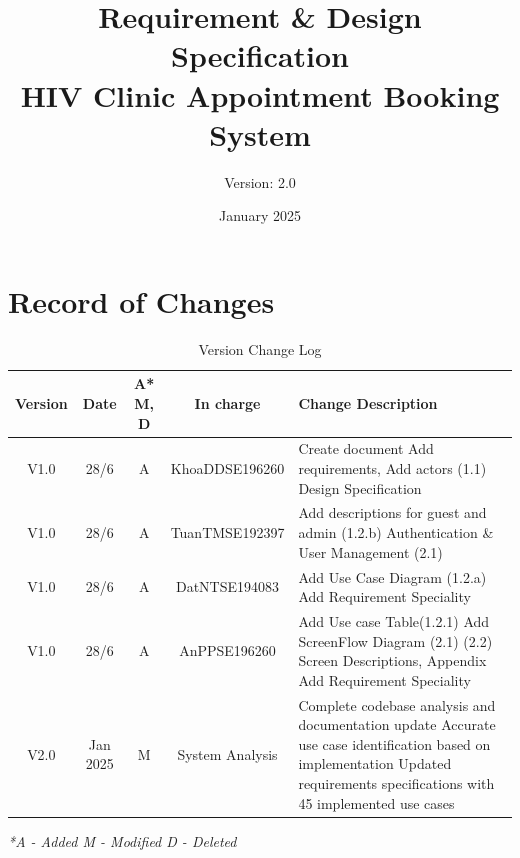 \documentclass[12pt,a4paper]{article}
\title{\textbf{Requirement \& Design Specification\\HIV Clinic Appointment Booking System}} \\
\author{Version: 2.0}
\date{January 2025}
\begin{document}
\maketitle
\thispagestyle{empty}

\newpage

\section*{Record of Changes}

\begin{table}[h!]
\centering
\renewcommand{\arraystretch}{1.5}
\begin{tabular}{|c|c|c|c|p{7.5cm}|}
\hline
\textbf{Version} & \textbf{Date} & \textbf{A* M, D} & \textbf{In charge} & \textbf{Change Description} \\
\hline
V1.0 & 28/6 & A & KhoaDDSE196260 & 
Create document \newline
Add requirements, Add actors (1.1) \newline
Design Specification\\
\hline
V1.0 & 28/6 & A & TuanTMSE192397 & 
Add descriptions for guest and admin (1.2.b) \newline
Authentication \& User Management (2.1) \\
\hline
V1.0 & 28/6 & A & DatNTSE194083 & 
Add Use Case Diagram (1.2.a)\newline 
Add Requirement Speciality
\\
\hline
V1.0 & 28/6 & A & AnPPSE196260 & 
Add Use case Table(1.2.1)
Add ScreenFlow Diagram (2.1) \newline
(2.2) Screen Descriptions, Appendix\newline 
Add Requirement Speciality\\
\hline
V2.0 & Jan 2025 & M & System Analysis & 
Complete codebase analysis and documentation update \newline
Accurate use case identification based on implementation \newline
Updated requirements specifications with 45 implemented use cases \\
\hline
\end{tabular}
\caption{Version Change Log}
\label{tab:version-log}
\end{table}

\textit{*A - Added M - Modified D - Deleted}

\newpage

\tableofcontents

\newpage
\end{document}
